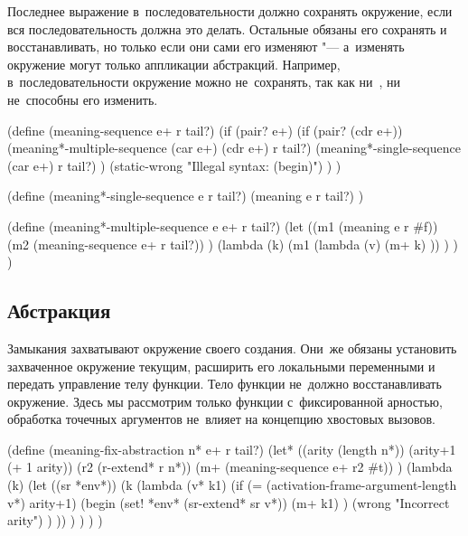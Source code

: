 Последнее выражение в~последовательности должно сохранять окружение, если вся
последовательность должна это делать. Остальные обязаны его сохранять и
восстанавливать, но только если они сами его изменяют "--- а~изменять окружение
могут только аппликации абстракций. Например, в~последовательности  окружение можно не~сохранять, так как ни~, ни~
не~способны его изменить.

\begin{code:lisp}
(define (meaning-sequence e+ r tail?)
  (if (pair? e+)
      (if (pair? (cdr e+))
          (meaning*-multiple-sequence (car e+) (cdr e+) r tail?)
          (meaning*-single-sequence (car e+) r tail?) )
      (static-wrong "Illegal syntax: (begin)") ) )

(define (meaning*-single-sequence e r tail?)
  (meaning e r tail?) )

(define (meaning*-multiple-sequence e e+ r tail?)
  (let ((m1 (meaning e r #f))
        (m2 (meaning-sequence e+ r tail?)) )
    (lambda (k)
      (m1 (lambda (v)
            (m+ k) )) ) ) )
\end{code:lisp}


\subsection{Абстракция}\label{fast/reject/ssect:abstraction}

Замыкания захватывают окружение своего создания. Они~же обязаны установить
захваченное окружение текущим, расширить его локальными переменными и передать
управление телу функции. Тело функции не~должно восстанавливать окружение. Здесь
мы рассмотрим только функции с~фиксированной арностью, обработка точечных
аргументов не~влияет на концепцию хвостовых вызовов.

\begin{code:lisp}
(define (meaning-fix-abstraction n* e+ r tail?)
  (let* ((arity (length n*))
         (arity+1 (+ 1 arity))
         (r2 (r-extend* r n*))
         (m+ (meaning-sequence e+ r2 #t)) )
    (lambda (k)
      (let ((sr *env*))
        (k (lambda (v* k1)
             (if (= (activation-frame-argument-length v*) arity+1)
                 (begin (set! *env* (sr-extend* sr v*))
                        (m+ k1) )
                 (wrong "Incorrect arity") ) )) ) ) ) )
\end{code:lisp}


